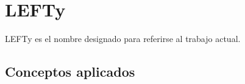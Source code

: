 
\chapter{LEFTy}

\label{Chapter5} %

LEFTy es el nombre designado para referirse al trabajo actual.

\section{Conceptos aplicados}
